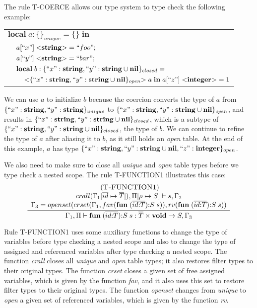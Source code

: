 The rule \textsc{T-COERCE} allows our type system to type check the following example:
\begin{center}
\begin{tabular}{lll}
\multicolumn{3}{l}{$\mathbf{local} \; a:\{\}_{unique} = \{ \} \; \mathbf{in}$}\\
& \multicolumn{2}{l}{$a[``x"] \; {<}\mathbf{string}{>} = ``foo";$}\\
& \multicolumn{2}{l}{$a[``y"] \; {<}\mathbf{string}{>} = ``bar";$}\\
& \multicolumn{2}{l}{$\mathbf{local} \; b:\{``x":\mathbf{string}, ``y":\mathbf{string} \cup \mathbf{nil} \}_{closed} =$}\\
& & \multicolumn{1}{l}{${<}\{``x":\mathbf{string}, ``y":\mathbf{string} \cup \mathbf{nil}\}_{open}{>} \; a \; \mathbf{in} \; a[``z"] \; {<}\mathbf{integer}{>} = 1$}
\end{tabular}
\end{center}

We can use $a$ to initialize $b$ because the coercion converts
the type of $a$ from $\{``x":\mathbf{string}, ``y":\mathbf{string}\}_{unique}$ to
$\{``x":\mathbf{string}, ``y":\mathbf{string} \cup \mathbf{nil}\}_{open}$, and results in
$\{``x":\mathbf{string}, ``y":\mathbf{string} \cup \mathbf{nil}\}_{closed}$,
which is a subtype of
$\{``x":\mathbf{string}, ``y":\mathbf{string} \cup \mathbf{nil}\}_{closed}$, the type of $b$.
We can continue to refine the type of $a$ after aliasing it to $b$,
as it still holds an \emph{open} table.
At the end of this example, $a$ has type
$\{``x":\mathbf{string}, ``y":\mathbf{string} \cup \mathbf{nil}, ``z":\mathbf{integer}\}_{open}$.

We also need to make sure to close all \emph{unique} and \emph{open}
table types before we type check a nested scope.
The rule \textsc{T-FUNCTION1} illustrates this case:
\[
\begin{array}{c}
\; (\textsc{T-FUNCTION1})\\
\dfrac{\begin{array}{c}
       crall(\Gamma_{1}[\overline{id} \mapsto \overline{T}]), \Pi[\rho \mapsto S] \vdash s, \Gamma_{2}\\
       \Gamma_{3} = openset(crset(\Gamma_{1}, fav(\mathbf{fun} \; (\overline{id{:}T}){:}S \; s)),rv(\mathbf{fun} \; (\overline{id{:}T}){:}S \; s))
       \end{array}}
      {\Gamma_{1}, \Pi \vdash \mathbf{fun} \; (\overline{id{:}T}){:}S \; s:\overline{T} \times \mathbf{void} \rightarrow S, \Gamma_{3}}
\end{array}
\]

Rule \textsc{T-FUNCTION1} uses some auxiliary functions to change
the type of variables before type checking a nested scope and
also to change the type of assigned and referenced variables after
type checking a nested scope.
The function \emph{crall} closes all \emph{unique} and \emph{open}
table types; it also restores filter types to their original types.
The function \emph{crset} closes a given set of free assigned variables,
which is given by the function \emph{fav}, and
it also uses this set to restore filter types to their original types.
The function \emph{openset} changes from \emph{unique} to \emph{open}
a given set of referenced variables, which is given by the function \emph{rv}.

